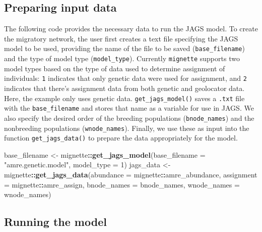 \documentclass[
]{book}
\newenvironment{Shaded}{\begin{snugshade}}{\end{snugshade}}
\newcommand{\AttributeTok}[1]{\textcolor[rgb]{0.13,0.29,0.53}{#1}}
\newcommand{\DecValTok}[1]{\textcolor[rgb]{0.00,0.00,0.81}{#1}}
\newcommand{\FunctionTok}[1]{\textcolor[rgb]{0.13,0.29,0.53}{\textbf{#1}}}
\newcommand{\NormalTok}[1]{#1}
\newcommand{\OtherTok}[1]{\textcolor[rgb]{0.56,0.35,0.01}{#1}}
\newcommand{\SpecialCharTok}[1]{\textcolor[rgb]{0.81,0.36,0.00}{\textbf{#1}}}
\newcommand{\StringTok}[1]{\textcolor[rgb]{0.31,0.60,0.02}{#1}}
\begin{document}
\hypertarget{preparing-input-data}{%
\subsection{Preparing input data}\label{preparing-input-data}}

The following code provides the necessary data to run the JAGS model. To create the migratory network, the user first creates a text file specifying the JAGS model to be used, providing the name of the file to be saved (\texttt{base\_filename}) and the type of model type (\texttt{model\_type}). Currently \texttt{mignette} supports two model types based on the type of data used to determine assignment of individuals: \texttt{1} indicates that only genetic data were used for assignment, and \texttt{2} indicates that there's assignment data from both genetic and geolocator data. Here, the example only uses genetic data. \texttt{get\_jags\_model()} saves a \texttt{.txt} file with the \texttt{base\_filename} and stores that name as a variable for use in JAGS. We also specify the desired order of the breeding populations (\texttt{bnode\_names}) and the nonbreeding populations (\texttt{wnode\_names}). Finally, we use these as input into the function \texttt{get\_jags\_data()} to prepare the data appropriately for the model.

\begin{Shaded}
\begin{Highlighting}[]
\NormalTok{base\_filename }\OtherTok{\textless{}{-}}\NormalTok{ mignette}\SpecialCharTok{::}\FunctionTok{get\_jags\_model}\NormalTok{(}\AttributeTok{base\_filename =} \StringTok{"amre.genetic.model"}\NormalTok{, }\AttributeTok{model\_type =} \DecValTok{1}\NormalTok{)}
\NormalTok{jags\_data }\OtherTok{\textless{}{-}}\NormalTok{ mignette}\SpecialCharTok{::}\FunctionTok{get\_jags\_data}\NormalTok{(}\AttributeTok{abundance =}\NormalTok{ mignette}\SpecialCharTok{::}\NormalTok{amre\_abundance, }
                           \AttributeTok{assignment =}\NormalTok{ mignette}\SpecialCharTok{::}\NormalTok{amre\_assign,}
                           \AttributeTok{bnode\_names =}\NormalTok{ bnode\_names, }
                           \AttributeTok{wnode\_names =}\NormalTok{ wnode\_names)}
\end{Highlighting}
\end{Shaded}

\hypertarget{running-the-model}{%
\subsection{Running the model}\label{running-the-model}}
\end{document}

